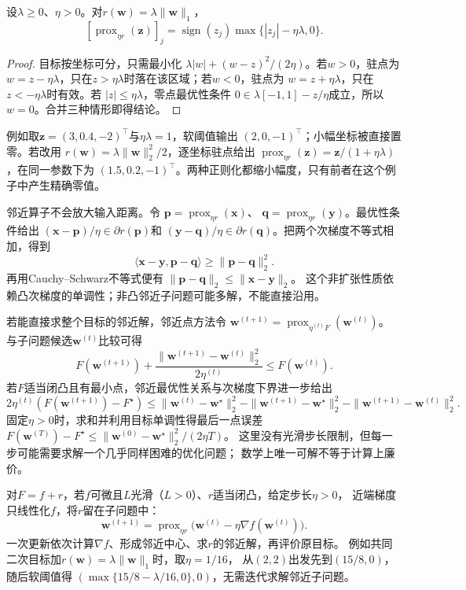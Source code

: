 \begin{theorem}
\label{thm:opt-soft-threshold}
设$\lambda\geq0$、$\eta>0$。对$r(\bm{w})=\lambda\lVert\bm{w}\rVert_1$，
\[
  [\operatorname{prox}_{\eta r}(\bm{z})]_j
  =\operatorname{sign}(z_j)\max\{|z_j|-\eta\lambda,0\}.
\]
\end{theorem}

\begin{proof}
目标按坐标可分，只需最小化
$\lambda|w|+(w-z)^2/(2\eta)$。若$w>0$，驻点为
$w=z-\eta\lambda$，只在$z>\eta\lambda$时落在该区域；若$w<0$，驻点为
$w=z+\eta\lambda$，只在$z<-\eta\lambda$时有效。若
$|z|\leq\eta\lambda$，零点最优性条件
$0\in\lambda[-1,1]-z/\eta$成立，所以$w=0$。合并三种情形即得结论。
\end{proof}

例如取$\bm z=(3,0.4,-2)^{\top}$与$\eta\lambda=1$，软阈值输出
$(2,0,-1)^{\top}$；小幅坐标被直接置零。若改用
$r(\bm w)=\lambda\lVert\bm w\rVert_2^2/2$，逐坐标驻点给出
$\operatorname{prox}_{\eta r}(\bm z)=\bm z/(1+\eta\lambda)$，在同一参数下为
$(1.5,0.2,-1)^{\top}$。两种正则化都缩小幅度，只有前者在这个例子中产生精确零值。

邻近算子不会放大输入距离。令
$\bm{p}=\operatorname{prox}_{\eta r}(\bm{x})$、
$\bm{q}=\operatorname{prox}_{\eta r}(\bm{y})$。最优性条件给出
$(\bm{x}-\bm{p})/\eta\in\partial r(\bm{p})$和
$(\bm{y}-\bm{q})/\eta\in\partial r(\bm{q})$。把两个次梯度不等式相加，得到
\[
  \langle\bm{x}-\bm{y},\bm{p}-\bm{q}\rangle
  \geq\lVert\bm{p}-\bm{q}\rVert_2^2.
\]
再用Cauchy--Schwarz不等式便有
$\lVert\bm{p}-\bm{q}\rVert_2\leq\lVert\bm{x}-\bm{y}\rVert_2$。
这个非扩张性质依赖凸次梯度的单调性；非凸邻近子问题可能多解，不能直接沿用。

若能直接求整个目标的邻近解，邻近点方法令
$\bm w^{(t+1)}=\operatorname{prox}_{\eta^{(t)} F}(\bm w^{(t)})$。
与子问题候选$\bm w^{(t)}$比较可得
\[
 F(\bm w^{(t+1)})+\frac{\|\bm w^{(t+1)}-\bm w^{(t)}\|_2^2}{2\eta^{(t)}}
 \leq F(\bm w^{(t)}).
\]
若$F$适当闭凸且有最小点，邻近最优性关系与次梯度下界进一步给出
\[
 2\eta^{(t)}(F(\bm w^{(t+1)})-F^\star)
 \leq\|\bm w^{(t)}-\bm w^\star\|_2^2
 -\|\bm w^{(t+1)}-\bm w^\star\|_2^2
 -\|\bm w^{(t+1)}-\bm w^{(t)}\|_2^2.
\]
固定$\eta>0$时，求和并利用目标单调性得最后一点误差
$F(\bm w^{(T)})-F^\star\leq\|\bm w^{(0)}-\bm w^\star\|_2^2/(2\eta T)$。
这里没有光滑步长限制，但每一步可能需要求解一个几乎同样困难的优化问题；
数学上唯一可解不等于计算上廉价。

对$F=f+r$，若$f$可微且$L$光滑（$L>0$）、$r$适当闭凸，给定步长$\eta>0$，
近端梯度只线性化$f$，将$r$留在子问题中：
\begin{equation}
 \bm w^{(t+1)}
 =\operatorname{prox}_{\eta r}
   \bigl(\bm w^{(t)}-\eta\nabla f(\bm w^{(t)})\bigr).
 \label{eq:opt-proximal-gradient-update}
\end{equation}
一次更新依次计算$\nabla f$、形成邻近中心、求$r$的邻近解，再评价原目标。
例如共同二次目标加$r(\bm w)=\lambda\|\bm w\|_1$时，取$\eta=1/16$，
从$(2,2)$出发先到$(15/8,0)$，随后软阈值得
$(\max\{15/8-\lambda/16,0\},0)$，无需迭代求解邻近子问题。

